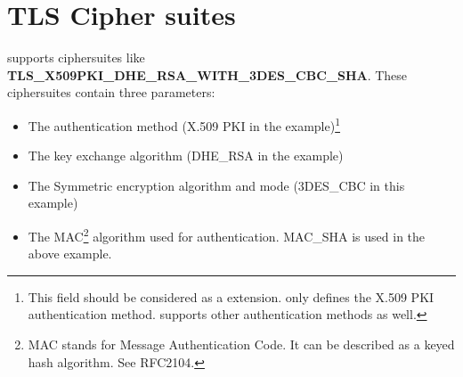 \newpage
\section{TLS Cipher suites}
\par 
\tlsI supports ciphersuites like {\bf TLS\_X509PKI\_DHE\_RSA\_WITH\_3DES\_CBC\_SHA}.
These ciphersuites contain three parameters:
\begin{itemize}
\item The authentication method (X.509 PKI in the example)\footnote{
This field should be considered as a \gnutls extension. \tlsI only defines
the X.509 PKI authentication method. \gnutls supports other authentication
methods as well.}
\item The key exchange algorithm (DHE\_RSA in the example)
\item The Symmetric encryption algorithm and mode (3DES\_CBC in this
example)
\item The MAC\footnote{MAC stands for Message Authentication Code. It can
be described as a keyed hash algorithm. See RFC2104.} algorithm used for authentication.
MAC\_SHA is used in the above example.
\end{itemize}

\addvspace{1.5cm}

